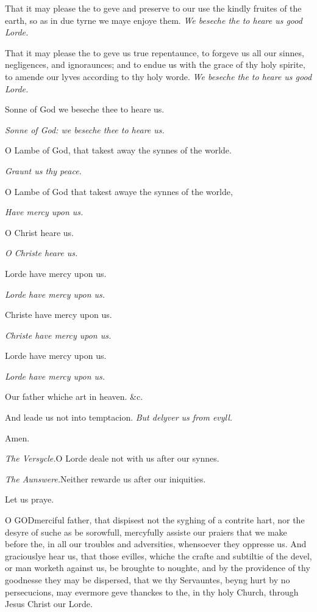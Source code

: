 That it may please the to geve and preserve to our use the kindly fruites
of the earth, so as in due tyrne we maye enjoye them.
\emph{We
beseche the to heare us good Lorde.}

That it may please the to geve us true repentaunce, to forgeve us all
our sinnes, negligences, and ignoraunces; and to endue us with the grace
of thy holy spirite, to amende our lyves according to thy holy worde.
\emph{We
beseche the to heare us good Lorde.}

Sonne of God we beseche thee to heare us.

\emph{Sonne of God: we beseche
thee to heare us.}

O
Lambe of God, that takest away the synnes of the worlde. 

\emph{Graunt us thy peace.}

O Lambe of God that takest awaye the synnes of the worlde,

\emph{Have mercy upon us.}

O Christ heare us.

\emph{O Christe heare us.}

Lorde have mercy upon us.

\emph{Lorde have mercy upon us.}

Christe have mercy upon us.

\emph{Christe have mercy upon
us.}

Lorde have mercy upon us.

\emph{Lorde have mercy upon us.}

Our father whiche art in heaven. \&c.

And leade us not into temptacion.
\emph{But
delyver us from evyll.}

Amen.

\emph{The Versycle.}O Lorde deale not with us after our synnes. 

\emph{The Aunswere.}Neither rewarde us after our iniquities.

Let
us praye.

O GOD\textbf{}merciful father, that
dispisest not the syghing of a contrite hart, nor the desyre of suche
as be sorowfull, mercyfully assiste our praiers that we make before the,
in all our troubles and adversities, whensoever they oppresse us. And
graciouslye hear us, that those evilles, whiche the crafte and subtiltie
of the devel, or man worketh against us, be broughte to noughte, and by
the providence of thy goodnesse they may be dispersed, that we thy Servauntes,
beyng hurt by no persecucions, may evermore geve thanckes to the, in thy
holy Church, through Jesus Christ our Lorde.

